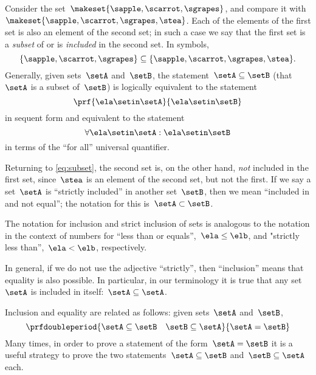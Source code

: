 Consider the set~$\makeset{ \sapple, \scarrot, \sgrapes }$, and compare it with~$\makeset{ \sapple, \scarrot, \sgrapes, \stea }$.
Each of the elements of the first set is also an element of the second set;
in such a case we say that the first set is a \emph{subset} of or is \emph{included} in the second set.
In symbols,
%
\begin{equation}
    \label{eq:subset}
    \{ \sapple, \scarrot, \sgrapes \} \subseteq \{ \sapple, \scarrot, \sgrapes, \stea \}.
\end{equation}
%
Generally, given sets~$\setA$ and~$\setB$, the statement~$\setA \subseteq \setB$ (that~$\setA$ is a subset of~$\setB$) is logically equivalent to the statement
%
\begin{equation}
    \prf{
        \ela \setin\setA
    }{
        \ela \setin\setB
    }
\end{equation}
in sequent form and equivalent to the statement
\begin{equation}\label{eq:inclusion-via-quantifier}
    \forall \ela \setin\setA : \ela \setin\setB
\end{equation}
in terms of the ``for all'' universal quantifier.

Returning to \cref{eq:subset}, the second set is, on the other hand, \emph{not} included in the first set, since~$\stea$ is an element of the second set, but not the first.
If we say a set~$\setA$ is ``strictly included'' in another set~$\setB$, then we mean ``included in and not equal''; the notation for this is~$\setA \subset \setB$.

The notation for inclusion and strict inclusion of sets is analogous to the notation in the context of numbers for ``less than or equals'',~$\ela \leq \elb$,  and "strictly less than'',~$\ela < \elb$, respectively.

In general, if we do not use the adjective ``strictly'', then ``inclusion'' means that equality is also possible.
In particular, in our terminology it is true that any set~$\setA$ is included in itself:~$\setA \subseteq \setA$.

Inclusion and equality are related as follows: given sets~$\setA$ and~$\setB$,
%
\begin{equation*}
    \prfdoubleperiod
        {\setA \subseteq \setB
        \quad
        \setB \subseteq \setA}{
        \setA = \setB}
\end{equation*}
%
Many times, in order to prove a statement of the form~$\setA = \setB$ it is a useful strategy to prove the two statements~$\setA \subseteq \setB$ and~$\setB \subseteq \setA$ each.

